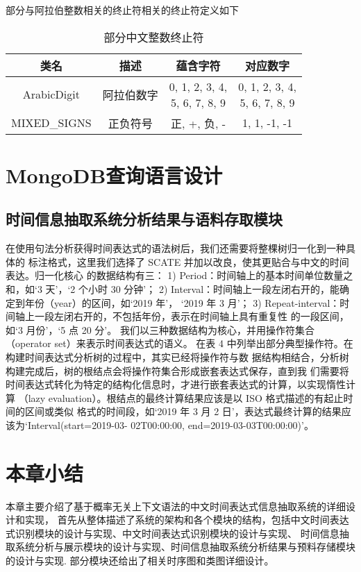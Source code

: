 部分与阿拉伯整数相关的终止符相关的终止符定义如下

\begin{table}[h]
    \centering
    \caption{部分中文整数终止符}
    \begin{tabular}{*{4}{c}}
        \toprule
        类名         & 描述       & 蕴含字符                     & 对应数字     \\
        \midrule
        ArabicDigit  & 阿拉伯数字 & \makecell*[c]{0, 1, 2, 3, 4,                \\ 5, 6, 7, 8, 9} & \makecell*[c]{0, 1, 2, 3, 4, \\ 5, 6, 7, 8, 9}         \\
        MIXED\_SIGNS & 正负符号   & 正, +, 负, -                 & 1, 1, -1, -1 \\
        \bottomrule
    \end{tabular}
\end{table}

\section{MongoDB查询语言设计}


\subsection{时间信息抽取系统分析结果与语料存取模块}

在使用句法分析获得时间表达式的语法树后，我们还需要将整棵树归一化到一种具体的
标注格式，这里我们选择了 SCATE 并加以改良，使其更贴合与中文的时间表达。归一化核心
的数据结构有三：
1) Period：时间轴上的基本时间单位数量之和，如‘3 天’，‘2 个小时 30 分钟’；
2) Interval：时间轴上一段左闭右开的，能确定到年份（year）的区间，如‘2019 年’，
‘2019 年 3 月’；
3) Repeat-interval：时间轴上一段左闭右开的，不包括年份，表示在时间轴上具有重复性
的一段区间，如‘3 月份’，‘5 点 20 分’。
我们以三种数据结构为核心，并用操作符集合（operator set）来表示时间表达式的语义。
在表 4 中列举出部分典型操作符。在构建时间表达式分析树的过程中，其实已经将操作符与数
据结构相结合，分析树构建完成后，树的根结点会将操作符集合形成嵌套表达式保存，直到我
们需要将时间表达式转化为特定的结构化信息时，才进行嵌套表达式的计算，以实现惰性计算
（lazy evaluation）。根结点的最终计算结果应该是以 ISO 格式描述的有起止时间的区间或类似
格式的时间段，如‘2019 年 3 月 2 日’，表达式最终计算的结果应该为‘Interval(start=2019-03-
02T00:00:00, end=2019-03-03T00:00:00)’。




\section{本章小结}

本章主要介绍了基于概率无关上下文语法的中文时间表达式信息抽取系统的详细设计和实现，
首先从整体描述了系统的架构和各个模块的结构，包括中文时间表达式识别模块的设计与实现、中文时间表达式识别模块的设计与实现、
时间信息抽取系统分析与展示模块的设计与实现、时间信息抽取系统分析结果与预料存储模块的设计与实现.
部分模块还给出了相关时序图和类图详细设计。
